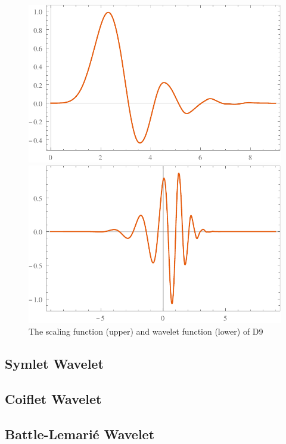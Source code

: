 \documentclass{book}
\begin{document}
\begin{figure}[h]
  \includegraphics{Figures/D9WaveletPhi.pdf}
  
  \includegraphics{Figures/D9WaveletPsi.pdf}
  \caption{The scaling function (upper) and wavelet function (lower) of D9}
\end{figure}

\subsection{Symlet Wavelet}

\subsection{Coiflet Wavelet}

\subsection{Battle-Lemari{\'e} Wavelet}
\end{document}
